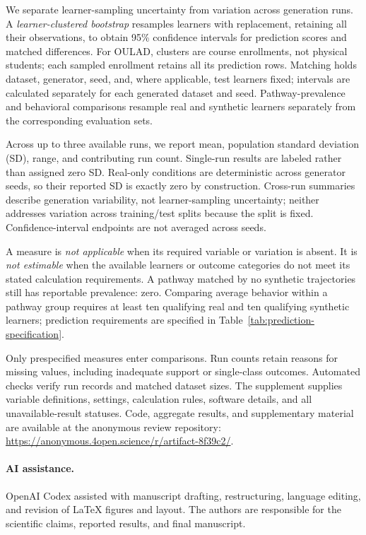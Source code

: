 \documentclass[fleqn,10pt]{JLA_article}
\begin{document}
We separate learner-sampling uncertainty from variation across generation runs. A \emph{learner-clustered bootstrap} resamples learners with replacement, retaining all their observations, to obtain 95\% confidence intervals for prediction scores and matched differences. For OULAD, clusters are course enrollments, not physical students; each sampled enrollment retains all its prediction rows. Matching holds dataset, generator, seed, and, where applicable, test learners fixed; intervals are calculated separately for each generated dataset and seed. Pathway-prevalence and behavioral comparisons resample real and synthetic learners separately from the corresponding evaluation sets.

Across up to three available runs, we report mean, population standard deviation (SD), range, and contributing run count. Single-run results are labeled rather than assigned zero SD. Real-only conditions are deterministic across generator seeds, so their reported SD is exactly zero by construction. Cross-run summaries describe generation variability, not learner-sampling uncertainty; neither addresses variation across training/test splits because the split is fixed. Confidence-interval endpoints are not averaged across seeds.

A measure is \emph{not applicable} when its required variable or variation is absent. It is \emph{not estimable} when the available learners or outcome categories do not meet its stated calculation requirements. A pathway matched by no synthetic trajectories still has reportable prevalence: zero. Comparing average behavior within a pathway group requires at least ten qualifying real and ten qualifying synthetic learners; prediction requirements are specified in Table~\ref{tab:prediction-specification}.

Only prespecified measures enter comparisons. Run counts retain reasons for missing values, including inadequate support or single-class outcomes. Automated checks verify run records and matched dataset sizes. The supplement supplies variable definitions, settings, calculation rules, software details, and all unavailable-result statuses. Code, aggregate results, and supplementary material are available at the anonymous review repository: \url{https://anonymous.4open.science/r/artifact-8f39c2/}.

\paragraph{AI assistance.}
OpenAI Codex assisted with manuscript drafting, restructuring, language editing, and revision of LaTeX figures and layout. The authors are responsible for the scientific claims, reported results, and final manuscript.
\end{document}
